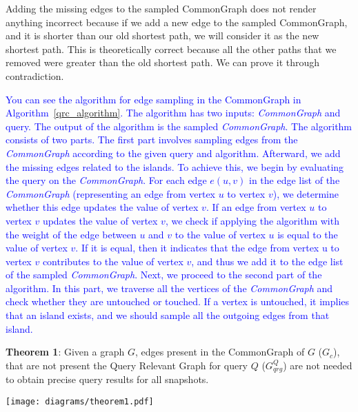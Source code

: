 Adding the missing edges to the sampled CommonGraph does not render anything incorrect because if we add a new edge to the sampled CommonGraph, and it is shorter than our old shortest path, we will consider it as the new shortest path. This is theoretically correct because all the other paths that we removed were greater than the old shortest path. We can prove it through contradiction. 

\textcolor{blue}{You can see the algorithm for edge sampling in the CommonGraph in Algorithm~\ref{qrc_algorithm}. The algorithm has two inputs: \emph{CommonGraph} and query. The output of the algorithm is the sampled \emph{CommonGraph}. The algorithm consists of two parts. The first part involves sampling edges from the \emph{CommonGraph} according to the given query and algorithm. Afterward, we add the missing edges related to the islands. To achieve this, we begin by evaluating the query on the \emph{CommonGraph}. For each edge $e(u, v)$ in the edge list of the \emph{CommonGraph} (representing an edge from vertex $u$ to vertex $v$), we determine whether this edge updates the value of vertex $v$. If an edge from vertex $u$ to vertex $v$ updates the value of vertex $v$, we check if applying the algorithm with the weight of the edge between $u$ and $v$ to the value of vertex $u$ is equal to the value of vertex $v$. If it is equal, then it indicates that the edge from vertex u to vertex $v$ contributes to the value of vertex $v$, and thus we add it to the edge list of the sampled \emph{CommonGraph}. Next, we proceed to the second part of the algorithm. In this part, we traverse all the vertices of the \emph{CommonGraph} and check whether they are untouched or touched. If a vertex is untouched, it implies that an island exists, and we should sample all the outgoing edges from that island.}



\vspace{0.075in}
\noindent
\textbf{Theorem 1}: 
Given a graph $G$, edges present in the CommonGraph of $G$ ($G_c$), that are not present the Query Relevant Graph for query $Q$ ($G_{qrg}^Q$) are not needed to obtain precise query results for all snapshots.

\hspace{0.5in}
\texttt{[image: diagrams/theorem1.pdf]}

